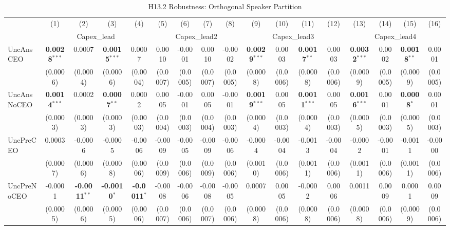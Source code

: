 \begin{landscape}
\begin{table}[H]
\setlength{\tabcolsep}{3pt}
\renewcommand{\arraystretch}{0.85}
\centering
\caption{H13.2 Robustness: Orthogonal Speaker Partition}
\label{tab:h13_2_robust}
\scriptsize
\begin{tabular}{lcccccccccccccccc}
\toprule
 & (1) & (2) & (3) & (4) & (5) & (6) & (7) & (8) & (9) & (10) & (11) & (12) & (13) & (14) & (15) & (16) \\
 & \multicolumn{4}{c}{Capex\_lead} & \multicolumn{4}{c}{Capex\_lead2} & \multicolumn{4}{c}{Capex\_lead3} & \multicolumn{4}{c}{Capex\_lead4} \\
\cmidrule(lr){2-5} \cmidrule(lr){6-9} \cmidrule(lr){10-13} \cmidrule(lr){14-17}
\midrule
UncAnsCEO & \textbf{0.0028}$^{***}$ & 0.0007 & \textbf{0.0015}$^{***}$ & 0.0007 & 0.0010 & -0.0001 & 0.0010 & -0.0002 & \textbf{0.0029}$^{***}$ & 0.0003 & \textbf{0.0017}$^{**}$ & 0.0003 & \textbf{0.0032}$^{***}$ & 0.0002 & \textbf{0.0018}$^{**}$ & 0.0001 \\
 & (0.0006) & (0.0004) & (0.0006) & (0.0004) & (0.0007) & (0.0005) & (0.0007) & (0.0005) & (0.0008) & (0.0006) & (0.0008) & (0.0006) & (0.0009) & (0.0005) & (0.0009) & (0.0005) \\
UncAnsNoCEO & \textbf{0.0014}$^{***}$ & 0.0002 & \textbf{0.0007}$^{**}$ & 0.0002 & 0.0005 & -0.0001 & 0.0005 & -0.0001 & \textbf{0.0019}$^{***}$ & 0.0005 & \textbf{0.0011}$^{***}$ & 0.0005 & \textbf{0.0016}$^{***}$ & 0.0001 & \textbf{0.0008}$^{*}$ & 0.0001 \\
 & (0.0003) & (0.0003) & (0.0003) & (0.0003) & (0.0004) & (0.0003) & (0.0004) & (0.0003) & (0.0004) & (0.0003) & (0.0004) & (0.0003) & (0.0005) & (0.0003) & (0.0005) & (0.0003) \\
UncPreCEO & 0.0003 & -0.0006 & -0.0005 & -0.0006 & -0.0009 & -0.0005 & -0.0009 & -0.0006 & -0.0004 & -0.0004 & -0.0013 & -0.0004 & -0.0002 & -0.0001 & -0.0011 & -0.0000 \\
 & (0.0007) & (0.0006) & (0.0008) & (0.0006) & (0.0009) & (0.0006) & (0.0009) & (0.0006) & (0.0010) & (0.0006) & (0.0011) & (0.0006) & (0.0011) & (0.0006) & (0.0011) & (0.0006) \\
UncPreNoCEO & -0.0001 & \textbf{-0.0011}$^{**}$ & \textbf{-0.0010}$^{*}$ & \textbf{-0.0011}$^{*}$ & -0.0008 & -0.0006 & -0.0008 & -0.0005 & 0.0007 & 0.0005 & -0.0002 & 0.0006 & 0.0011 & 0.0009 & 0.0001 & 0.0009 \\
 & (0.0005) & (0.0006) & (0.0005) & (0.0006) & (0.0007) & (0.0006) & (0.0007) & (0.0006) & (0.0008) & (0.0006) & (0.0008) & (0.0006) & (0.0008) & (0.0006) & (0.0009) & (0.0006) \\

\end{tabular}
\end{table}
\end{landscape}
